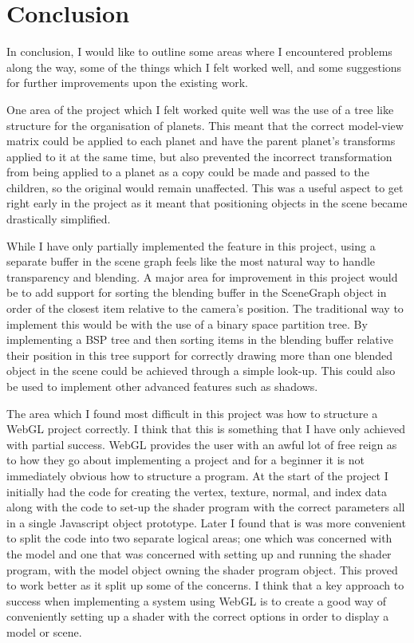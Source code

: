\documentclass[paper=a4, fontsize=11pt]{scrartcl}	%
\numberwithin{equation}{section}															%
\numberwithin{figure}{section}																%
\numberwithin{table}{section}																%
\begin{document}
\section{Conclusion}
\label{sec:conclusion}
In conclusion, I would like to outline some areas where I encountered problems along the way, some of the things which I felt worked well, and some suggestions for further improvements upon the existing work. 

One area of the project which I felt worked quite well was the use of a tree like structure for the organisation of planets. This meant that the correct model-view matrix could be applied to each planet and have the parent planet's transforms applied to it at the same time, but also prevented the incorrect transformation from being applied to a planet as a copy could be made and passed to the children, so the original would remain unaffected. This was a useful aspect to get right early in the project as it meant that positioning objects in the scene became drastically simplified.

While I have only partially implemented the feature in this project, using a separate buffer in the scene graph feels like the most natural way to handle transparency and blending. A major area for improvement in this project would be to add support for sorting the blending buffer in the SceneGraph object in order of the closest item relative to the camera's position. The traditional way to implement this would be with the use of a binary space partition tree. By implementing a BSP tree and then sorting items in the blending buffer relative their position in this tree support for correctly drawing more than one blended object in the scene could be achieved through a simple look-up. This could also be used to implement other advanced features such as shadows.

The area which I found most difficult in this project was how to structure a WebGL project correctly. I think that this is something that I have only achieved with partial success. WebGL provides the user with an awful lot of free reign as to how they go about implementing a project and for a beginner it is not immediately obvious how to structure a program. At the start of the project I initially had the code for creating the vertex, texture, normal, and index data along with the code to set-up the shader program with the correct parameters all in a single Javascript object prototype. Later I found that is was more convenient to split the code into two separate logical areas; one which was concerned with the model and one that was concerned with setting up and running the shader program, with the model object owning the shader program object. This proved to work better as it split up some of the concerns. I think that a key approach to success when implementing a system using WebGL is to create a good way of conveniently setting up a shader with the correct options in order to display a model or scene.
\end{document}
